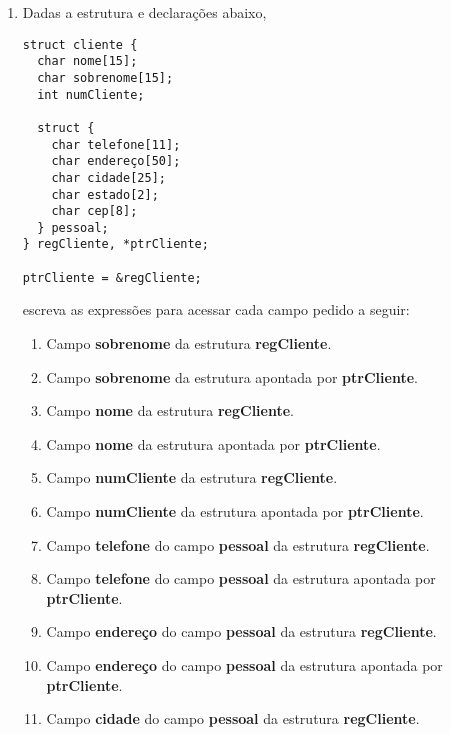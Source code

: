 \documentclass[a4paper,11pt]{article}
\begin{document}
\begin{multicols*}{2}
\begin{enumerate}
  \item Dadas a estrutura e declarações abaixo,

    \begin{verbatim}
struct cliente {
  char nome[15];
  char sobrenome[15];
  int numCliente;

  struct {
    char telefone[11];
    char endereço[50];
    char cidade[25];
    char estado[2];
    char cep[8];
  } pessoal;
} regCliente, *ptrCliente;

ptrCliente = &regCliente;
    \end{verbatim}

  escreva as expressões para acessar cada campo pedido a seguir:

    \begin{enumerate}
      \item Campo \textbf{sobrenome} da estrutura \textbf{regCliente}.
      \item Campo \textbf{sobrenome} da estrutura apontada por \textbf{ptrCliente}.
      \item Campo \textbf{nome} da estrutura \textbf{regCliente}.
      \item Campo \textbf{nome} da estrutura apontada por \textbf{ptrCliente}.
      \item Campo \textbf{numCliente} da estrutura \textbf{regCliente}.
      \item Campo \textbf{numCliente} da estrutura apontada por \textbf{ptrCliente}.
      \item Campo \textbf{telefone} do campo \textbf{pessoal} da estrutura \textbf{regCliente}.
      \item Campo \textbf{telefone} do campo \textbf{pessoal} da estrutura apontada por \textbf{ptrCliente}.
      \item Campo \textbf{endereço} do campo \textbf{pessoal} da estrutura \textbf{regCliente}.
      \item Campo \textbf{endereço} do campo \textbf{pessoal} da estrutura apontada por \textbf{ptrCliente}.
      \item Campo \textbf{cidade} do campo \textbf{pessoal} da estrutura \textbf{regCliente}.

      \pagebreak
      \vspace*{0.0cm}


\end{enumerate}
\end{enumerate}
\end{multicols*}
\end{document}
